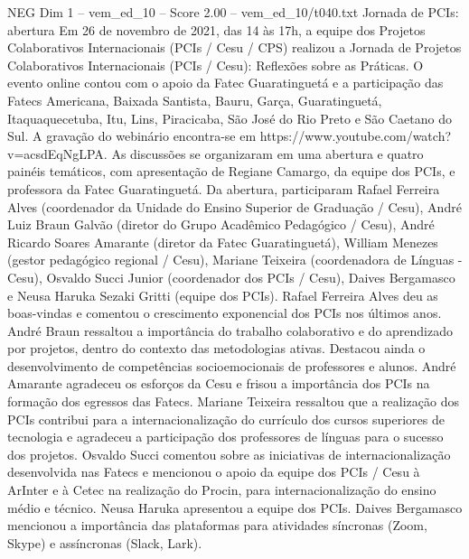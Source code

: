 \begin{textsample}{NEG Dim 1 – vem\_ed\_10 – Score 2.00 – vem\_ed\_10/t040.txt}  \label{ex:f1_neg_067}
Jornada de PCIs: abertura Em 26 de novembro de 2021, das 14 às 17h, a equipe dos Projetos Colaborativos Internacionais (PCIs / Cesu / CPS) realizou a Jornada de Projetos Colaborativos Internacionais (PCIs / Cesu): Reflexões sobre as Práticas.
O evento online contou com o apoio da Fatec Guaratinguetá e a participação das Fatecs Americana, Baixada Santista, Bauru, Garça, Guaratinguetá, Itaquaquecetuba, Itu, Lins, Piracicaba, São José do Rio Preto e São Caetano do Sul.
A gravação do webinário encontra-se em https://www.youtube.com/watch?v=acsdEqNgLPA.
As discussões se organizaram em uma abertura e quatro painéis temáticos, com apresentação de Regiane Camargo, da equipe dos PCIs, e professora da Fatec Guaratinguetá.
Da abertura, participaram Rafael Ferreira Alves (coordenador da Unidade do Ensino Superior de Graduação / Cesu), André Luiz Braun Galvão (diretor do Grupo Acadêmico Pedagógico / Cesu), André Ricardo Soares Amarante (diretor da Fatec Guaratinguetá), William Menezes (gestor pedagógico regional / Cesu), Mariane Teixeira (coordenadora de Línguas - Cesu), Osvaldo Succi Junior (coordenador dos PCIs / Cesu), Daives Bergamasco e Neusa Haruka Sezaki Gritti (equipe dos PCIs).
Rafael Ferreira Alves deu as boas-vindas e comentou o crescimento exponencial dos PCIs nos últimos anos.
André Braun ressaltou a importância do trabalho colaborativo e do aprendizado por projetos, dentro do contexto das metodologias ativas.
Destacou ainda o desenvolvimento de competências socioemocionais de professores e alunos.
André Amarante agradeceu os esforços da Cesu e frisou a importância dos PCIs na formação dos egressos das Fatecs.
Mariane Teixeira ressaltou que a realização dos PCIs contribui para a internacionalização do currículo dos cursos superiores de tecnologia e agradeceu a participação dos professores de línguas para o sucesso dos projetos.
Osvaldo Succi comentou sobre as iniciativas de internacionalização desenvolvida nas Fatecs e mencionou o apoio da equipe dos PCIs / Cesu à ArInter e à Cetec na realização do Procin, para internacionalização do ensino médio e técnico.
Neusa Haruka apresentou a equipe dos PCIs.
Daives Bergamasco mencionou a importância das plataformas para atividades síncronas (Zoom, Skype) e assíncronas (Slack, Lark).

\end{textsample}

